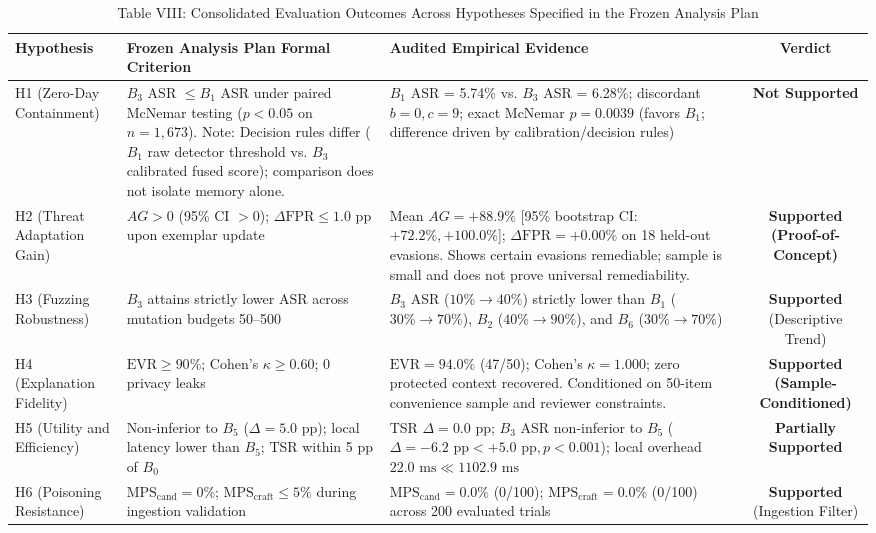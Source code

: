 \begin{table}[t]
\centering
\caption{Table VIII: Consolidated Evaluation Outcomes Across Hypotheses Specified in the Frozen Analysis Plan}
\begin{tabular}{l p{5.2cm} p{7.3cm} c}
\hline
\textbf{Hypothesis} & \textbf{Frozen Analysis Plan Formal Criterion} & \textbf{Audited Empirical Evidence} & \textbf{Verdict} \\
\hline
H1 (Zero-Day Containment) & $B_3$ ASR $\le B_1$ ASR under paired McNemar testing ($p < 0.05$ on $n=1,673$). Note: Decision rules differ ($B_1$ raw detector threshold vs. $B_3$ calibrated fused score); comparison does not isolate memory alone. & $B_1$ ASR = 5.74\% vs. $B_3$ ASR = 6.28\%; discordant $b=0, c=9$; exact McNemar $p = 0.0039$ (favors $B_1$; difference driven by calibration/decision rules) & \textbf{Not Supported} \\
H2 (Threat Adaptation Gain) & $AG > 0$ (95\% CI $> 0$); $\Delta\text{FPR} \le 1.0\text{ pp}$ upon exemplar update & Mean $AG = +88.9\%$ [95\% bootstrap CI: $+72.2\%, +100.0\%$]; $\Delta\text{FPR} = +0.00\%$ on 18 held-out evasions. Shows certain evasions remediable; sample is small and does not prove universal remediability. & \textbf{Supported (Proof-of-Concept)} \\
H3 (Fuzzing Robustness) & $B_3$ attains strictly lower ASR across mutation budgets 50--500 & $B_3$ ASR ($10\% \to 40\%$) strictly lower than $B_1$ ($30\% \to 70\%$), $B_2$ ($40\% \to 90\%$), and $B_6$ ($30\% \to 70\%$) & \textbf{Supported} (Descriptive Trend) \\
H4 (Explanation Fidelity) & $\text{EVR} \ge 90\%$; Cohen's $\kappa \ge 0.60$; 0 privacy leaks & $\text{EVR} = 94.0\%$ (47/50); Cohen's $\kappa = 1.000$; zero protected context recovered. Conditioned on 50-item convenience sample and reviewer constraints. & \textbf{Supported (Sample-Conditioned)} \\
H5 (Utility and Efficiency) & Non-inferior to $B_5$ ($\Delta = 5.0\text{ pp}$); local latency lower than $B_5$; TSR within 5 pp of $B_0$ & TSR $\Delta = 0.0\text{ pp}$; $B_3$ ASR non-inferior to $B_5$ ($\Delta = -6.2\text{ pp} < +5.0\text{ pp}, p < 0.001$); local overhead $22.0\text{ ms} \ll 1102.9\text{ ms}$ & \textbf{Partially Supported} \\
H6 (Poisoning Resistance) & $\text{MPS}_{\text{cand}} = 0\%$; $\text{MPS}_{\text{craft}} \le 5\%$ during ingestion validation & $\text{MPS}_{\text{cand}} = 0.0\%$ (0/100); $\text{MPS}_{\text{craft}} = 0.0\%$ (0/100) across 200 evaluated trials & \textbf{Supported} (Ingestion Filter) \\
\hline
\end{tabular}
\end{table}
